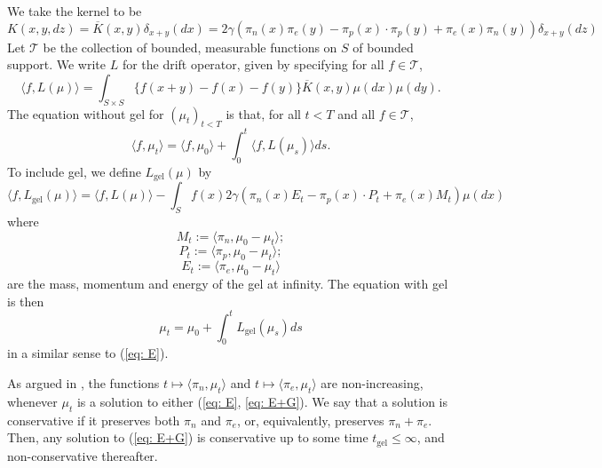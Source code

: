 We take the kernel to be  \begin{equation}
    K(x,y,dz)=\overline{K}(x,y)\delta_{x+y}(dx)=2\gamma\left(\pi_n(x)\pi_e(y)-\pi_p(x)\cdot \pi_p(y)+\pi_e(x)\pi_n(y)\right)\delta_{x+y}(dz)
\end{equation} Let $\mathcal{T}$ be the collection of bounded, measurable functions on $S$ of bounded support. We write $L$ for the drift operator, given by specifying for all $f\in \mathcal{T}$, \begin{equation} \label{eq: drift wo gel}
    \langle f,L(\mu)\rangle=\int_{S\times S}\{f(x+y)-f(x)-f(y)\}\overline{K}(x,y)\mu(dx)\mu(dy).
\end{equation} The equation without gel for $(\mu_t)_{t<T}$ is that, for all $t<T$ and all $f\in \mathcal{T}$, \begin{equation}
    \label{eq: E} \langle f, \mu_t\rangle =\langle f, \mu_0 \rangle +\int_0^t \langle f, L(\mu_s)\rangle ds. 
\end{equation} To include gel, we define $L_\text{gel}(\mu)$ by \begin{equation}
    \langle f, L_\text{gel}(\mu)\rangle = \langle f, L(\mu)\rangle -\int_S f(x) 2\gamma\left(\pi_n(x)E_t-\pi_p(x)\cdot P_t + \pi_e(x)M_t\right) \mu(dx)
\end{equation} where \begin{equation}
    M_t:=\langle \pi_n, \mu_0-\mu_t\rangle;
\end{equation}
\begin{equation}
    P_t:=\langle \pi_p, \mu_0-\mu_t\rangle;
\end{equation}\begin{equation}
    E_t:=\langle \pi_e, \mu_0-\mu_t\rangle
\end{equation} are the mass, momentum and energy of the gel at infinity. The equation with gel is then \begin{equation} \label{eq: E+G}
    \mu_t= \mu_0 + \int_0^t L_\text{gel}(\mu_s)ds
\end{equation} in a similar sense to (\ref{eq: E}). \begin{remark} As argued in \cite{N00}, the functions $t\mapsto \langle \pi_n, \mu_t\rangle$ and $t\mapsto \langle \pi_e, \mu_t\rangle$ are non-increasing, whenever $\mu_t$ is a solution to either (\ref{eq: E}, \ref{eq: E+G}). We say that a solution is conservative if it preserves both $\pi_n$ and $\pi_e$, or, equivalently, preserves $\pi_n+\pi_e$. Then, any solution to (\ref{eq: E+G}) is conservative up to some time $t_\text{gel}\leq \infty$, and non-conservative thereafter. \end{remark}
